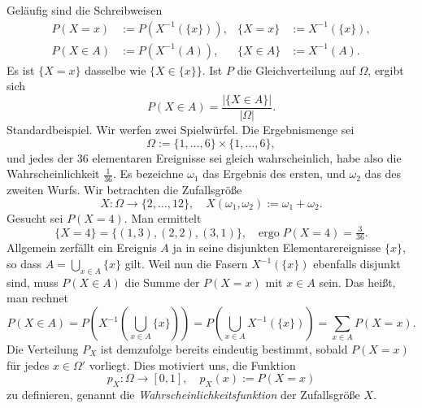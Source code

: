 Geläufig sind die Schreibweisen
\begin{align*}
P(X=x) &:= P(X^{-1}(\{x\})), & \{X=x\} &:= X^{-1}(\{x\}),\\
P(X\in A) &:= P(X^{-1}(A)), & \{X\in A\} &:= X^{-1}(A).
\end{align*}
Es ist $\{X=x\}$ dasselbe wie $\{X\in\{x\}\}$. 
Ist $P$ die Gleichverteilung auf $\Omega$, ergibt sich
\[P(X\in A) = \frac{|\{X\in A\}|}{|\Omega|}.\]
Standardbeispiel. Wir werfen zwei Spielwürfel.
Die Ergebnismenge sei%
\[\Omega := \{1,\ldots,6\}\times\{1,\ldots,6\},\]
und jedes der 36 elementaren Ereignisse sei gleich wahrscheinlich, habe
also die Wahrscheinlichkeit $\tfrac{1}{36}$.
Es bezeichne $\omega_1$ das Ergebnis des ersten, und $\omega_2$
das des zweiten Wurfs. Wir betrachten die Zufallsgröße%
\[X\colon\Omega\to\{2,\ldots,12\},\quad
X(\omega_1,\omega_2) := \omega_1+\omega_2.\]
Gesucht sei $P(X=4)$. Man ermittelt
\[\{X=4\} = \{(1,3), (2,2), (3,1)\},\quad\text{ergo}\;P(X=4) = \tfrac{3}{36}.\]
Allgemein zerfällt ein Ereignis $A$ ja in seine disjunkten Elementarereignisse
$\{x\}$, so dass $A = \bigcup_{x\in A} \{x\}$ gilt. Weil nun die
Fasern $X^{-1}(\{x\})$ ebenfalls disjunkt sind, muss $P(X\in A)$ die
Summe der $P(X=x)$ mit $x\in A$ sein. Das heißt, man rechnet%
\[P(X\in A) = P(X^{-1}(\bigcup_{x\in A} \{x\})) = P(\bigcup_{x\in A} X^{-1}(\{x\}))
= \sum_{x\in A} P(X=x).\]
Die Verteilung $P_X$ ist demzufolge bereits eindeutig bestimmt,
sobald $P(X=x)$ für jedes $x\in\Omega'$ vorliegt. Dies motiviert
uns, die Funktion
\[p_X\colon\Omega\to[0,1],\quad p_X(x) := P(X=x)\]
zu definieren, genannt die \emph{Wahrscheinlichkeitsfunktion} der
Zufallsgröße $X$.
